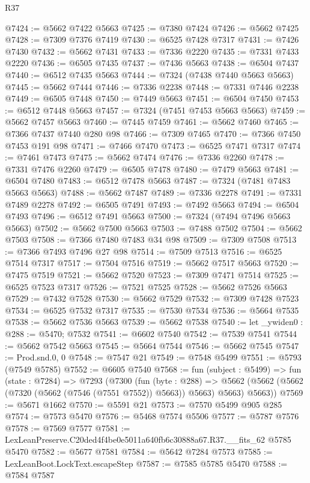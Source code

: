 \begin{lexlean}{R37}
\begin{coremodule}
@7424 := @5662 @7422 @5663
@7425 := @7380 @7424
@7426 := @5662 @7425
@7428 := @7309 @7376 @7419
@7430 := @6525 @7428 @7317
@7431 := @7426 @7430
@7432 := @5662 @7431
@7433 := @7336 @2220
@7435 := @7331 @7433 @2220
@7436 := @6505 @7435
@7437 := @7436 @5663
@7438 := @6504 @7437
@7440 := @6512 @7435 @5663
@7444 := @7324 (@7438 @7440 @5663 @5663)
@7445 := @5662 @7444
@7446 := @7336 @2238
@7448 := @7331 @7446 @2238
@7449 := @6505 @7448
@7450 := @7449 @5663
@7451 := @6504 @7450
@7453 := @6512 @7448 @5663
@7457 := @7324 (@7451 @7453 @5663 @5663)
@7459 := @5662 @7457 @5663
@7460 := @7445 @7459
@7461 := @5662 @7460
@7465 := @7366 @7437 @7440 @280 @98
@7466 := @7309 @7465
@7470 := @7366 @7450 @7453 @191 @98
@7471 := @7466 @7470
@7473 := @6525 @7471 @7317
@7474 := @7461 @7473
@7475 := @5662 @7474
@7476 := @7336 @2260
@7478 := @7331 @7476 @2260
@7479 := @6505 @7478
@7480 := @7479 @5663
@7481 := @6504 @7480
@7483 := @6512 @7478 @5663
@7487 := @7324 (@7481 @7483 @5663 @5663)
@7488 := @5662 @7487
@7489 := @7336 @2278
@7491 := @7331 @7489 @2278
@7492 := @6505 @7491
@7493 := @7492 @5663
@7494 := @6504 @7493
@7496 := @6512 @7491 @5663
@7500 := @7324 (@7494 @7496 @5663 @5663)
@7502 := @5662 @7500 @5663
@7503 := @7488 @7502
@7504 := @5662 @7503
@7508 := @7366 @7480 @7483 @34 @98
@7509 := @7309 @7508
@7513 := @7366 @7493 @7496 @27 @98
@7514 := @7509 @7513
@7516 := @6525 @7514 @7317
@7517 := @7504 @7516
@7519 := @5662 @7517 @5663
@7520 := @7475 @7519
@7521 := @5662 @7520
@7523 := @7309 @7471 @7514
@7525 := @6525 @7523 @7317
@7526 := @7521 @7525
@7528 := @5662 @7526 @5663
@7529 := @7432 @7528
@7530 := @5662 @7529
@7532 := @7309 @7428 @7523
@7534 := @6525 @7532 @7317
@7535 := @7530 @7534
@7536 := @5664 @7535
@7538 := @5662 @7536 @5663
@7539 := @5662 @7538
@7540 := let _ywiden0 : @288 := @5470; @7532
@7541 := @6602 @7540
@7542 := @7539 @7541
@7544 := @5662 @7542 @5663
@7545 := @5664 @7544
@7546 := @5662 @7545
@7547 := Prod.snd.{0, 0}
@7548 := @7547 @21
@7549 := @7548 @5499
@7551 := @5793 (@7549 @5785)
@7552 := @6605 @7540
@7568 := fun (subject : @5499) =>
  fun (state : @7284) =>
  @7293
    (@7300
      (fun (byte : @288) =>
      @5662 (@5662 (@5662 (@7320 (@5662 (@7546 (@7551 @7552)) @5663)) @5663) @5663) @5663))
@7569 := @5671 @1662
@7570 := @5591 @21
@7573 := @7570 @5499 @905 @285
@7574 := @7573 @5470
@7576 := @5468 @7574 @5506
@7577 := @5787 @7576
@7578 := @7569 @7577
@7581 := LexLeanPreserve.C20ded4f4be0e5011a640fb6c30888a67.R37.__fits_62 @5785 @5470
@7582 := @5677 @7581
@7584 := @5642 @7284 @7573
@7585 := LexLeanBoot.LockText.escapeStep
@7587 := @7585 @5785 @5470
@7588 := @7584 @7587

\end{coremodule}
\end{lexlean}
